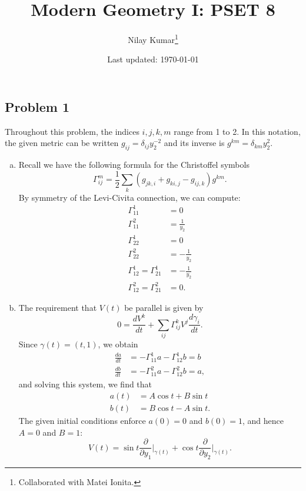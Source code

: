 \documentclass{../mathnotes}
\title{Modern Geometry I: PSET 8}
\author{Nilay Kumar\footnote{Collaborated with Matei Ionita.}}
\date{Last updated: \today}
\begin{document}
\maketitle

\subsection*{Problem 1}
Throughout this problem, the indices $i,j,k,m$ range from 1 to 2. In this notation, the given metric
can be written $g_{ij}=\delta_{ij}y_2^{-2}$ and its inverse is $g^{km}=\delta_{km}y_2^2$.
\begin{enumerate}[(a)]
    \item Recall we have the following formula for the Christoffel symbols
        \[\Gamma_{ij}^m=\frac{1}{2}\sum_{k}\left(g_{jk,i}+g_{ki,j}-g_{ij,k}\right)g^{km}.\]
        By symmetry of the Levi-Civita connection, we can compute:
        \begin{align*}
            \Gamma_{11}^1 &= 0\\
            \Gamma_{11}^2 &= \frac{1}{y_2}\\
            \Gamma_{22}^1 &= 0\\
            \Gamma_{22}^2 &= -\frac{1}{y_2}\\
            \Gamma_{12}^1 = \Gamma_{21}^1 &= -\frac{1}{y_2}\\
            \Gamma_{12}^2 =\Gamma_{21}^2 &= 0.
        \end{align*}
    \item The requirement that $V(t)$ be parallel is given by
        \[0 = \frac{dV^k}{dt}+\sum_{ij}\Gamma_{ij}^kV^j\frac{d\gamma_i}{dt}.\]
        Since $\gamma(t)=(t,1)$, we obtain
        \begin{align*}
            \frac{da}{dt} &= -\Gamma_{11}^1a-\Gamma_{12}^1b=b\\
            \frac{db}{dt} &= -\Gamma_{11}^2a-\Gamma_{12}^2b=a,
        \end{align*}
        and solving this system, we find that
        \begin{align*}
            a(t)&=A\cos t+B\sin t\\
            b(t)&=B\cos t-A\sin t.
        \end{align*}
        The given initial conditions enforce $a(0)=0$ and $b(0)=1$, and hence $A=0$ and $B=1$:
        \[V(t)=\sin t \frac{\partial}{\partial y_1}\bigg|_{\gamma(t)}+\cos t \frac{\partial}{\partial y_2}\bigg|_{\gamma(t)}.\]
\end{enumerate}
\end{document}
